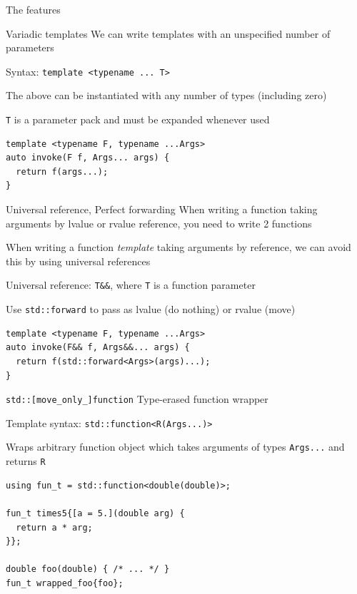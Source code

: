 \documentclass{beamer}
\begin{document}
\begin{frame}[standout]
The features
\end{frame}

\begin{frame}[fragile]{Variadic templates}
We can write templates with an unspecified number of parameters

Syntax: \texttt{template <typename ... T>}

The above can be instantiated with any number of types (including zero)

\texttt{T} is a parameter pack and must be expanded whenever used

\scriptsize
\vspace{.5cm}
\begin{verbatim}
template <typename F, typename ...Args>
auto invoke(F f, Args... args) {
  return f(args...);
}
\end{verbatim}
\end{frame}

\begin{frame}[fragile]{Universal reference, Perfect forwarding}
When writing a function taking arguments by lvalue or rvalue reference, you need to write 2 functions

When writing a function \textit{template} taking arguments by reference, we can avoid this by using universal references

Universal reference: \texttt{T\&\&}, where \texttt{T} is a function parameter

Use \texttt{std::forward} to pass as lvalue (do nothing) or rvalue (move)

\scriptsize
\vspace{.5cm}
\begin{verbatim}
template <typename F, typename ...Args>
auto invoke(F&& f, Args&&... args) {
  return f(std::forward<Args>(args)...);
}
\end{verbatim}
\end{frame}

\begin{frame}[fragile]{\texttt{std::[move\_only\_]function}}
Type-erased function wrapper

Template syntax: \texttt{std::function<R(Args...)>}

Wraps arbitrary function object which takes arguments of types \texttt{Args...} and returns \texttt{R}

\scriptsize
\vspace{.5cm}
\begin{verbatim}
using fun_t = std::function<double(double)>;

fun_t times5{[a = 5.](double arg) {
  return a * arg;
}};

double foo(double) { /* ... */ }
fun_t wrapped_foo{foo};
\end{verbatim}
\end{frame}
\end{document}
